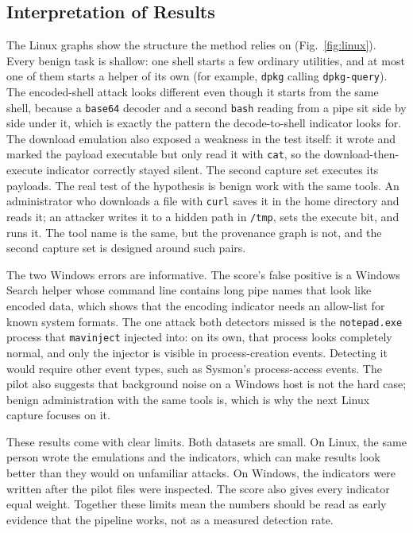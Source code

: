 \documentclass[conference]{IEEEtran}
\begin{document}
\subsection{Interpretation of Results}
The Linux graphs show the structure the method relies on
(Fig.~\ref{fig:linux}). Every benign task is shallow: one shell starts a few
ordinary utilities, and at most one of them starts a helper of its own (for
example, \texttt{dpkg} calling \texttt{dpkg-query}). The encoded-shell attack
looks different even though it starts from the same shell, because a
\texttt{base64} decoder and a second \texttt{bash} reading from a pipe sit
side by side under it, which is exactly the pattern the decode-to-shell
indicator looks for. The download emulation also exposed a weakness in the
test itself: it wrote and marked the payload executable but only read it
with \texttt{cat}, so the download-then-execute indicator correctly stayed
silent. The second capture set executes its payloads. The real test of the
hypothesis is benign work with the same tools. An administrator who
downloads a file with \texttt{curl} saves it in the home directory and reads
it; an attacker writes it to a hidden path in \texttt{/tmp}, sets the execute
bit, and runs it. The tool name is the same, but the provenance graph is
not, and the second capture set is designed around such pairs.

The two Windows errors are informative. The score's false positive is a
Windows Search helper whose command line contains long pipe names that look
like encoded data, which shows that the encoding indicator needs an
allow-list for known system formats. The one attack both detectors missed is
the \texttt{notepad.exe} process that \texttt{mavinject} injected into: on
its own, that process looks completely normal, and only the injector is
visible in process-creation events. Detecting it would require other event
types, such as Sysmon's process-access events. The pilot also suggests that
background noise on a Windows host is not the hard case; benign
administration with the same tools is, which is why the next Linux capture
focuses on it.

These results come with clear limits. Both datasets are small. On Linux, the
same person wrote the emulations and the indicators, which can make results
look better than they would on unfamiliar attacks. On Windows, the
indicators were written after the pilot files were inspected. The score also
gives every indicator equal weight. Together these limits mean the numbers
should be read as early evidence that the pipeline works, not as a measured
detection rate.
\end{document}
